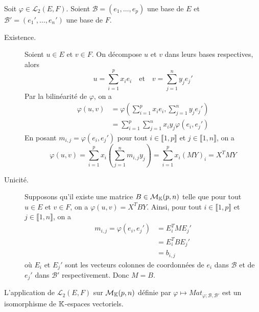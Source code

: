 \documentclass[a4paper, 12pt]{article}
\begin{document}
\begin{demonstration}
    Soit $\varphi \in \mathcal{L}_2(E, F)$. Soient $\mathscr{B} = (e_1, \dots, e_p)$ une base de $E$ et $\mathscr{B'} = (e_1', \dots, e_n')$ une base de $F$.
    \begin{description}
        \item[Existence.] Soient $u \in E$ et $v \in F$. On décompose $u$ et $v$ dans leurs bases respectives, alors
        $$
        u = \sum_{i=1}^p x_i e_i \quad \text{et} \quad v = \sum_{j=1}^n y_j e_j'
        $$
        Par la bilinéarité de $\varphi$, on a
        \begin{align*}
            \varphi(u, v) &= \varphi(\sum_{i=1}^p x_i e_i, \sum_{j=1}^n y_j e_j') \\
            &= \sum_{i=1}^p \sum_{j=1}^n x_i y_j \varphi(e_i, e_j')
        \end{align*}
        En posant $m_{i, j} = \varphi(e_i, e_j')$ pour tout $i \in \llbracket 1, p \rrbracket$ et $j \in \llbracket 1, n \rrbracket$, on a
        $$
        \varphi(u, v) = \sum_{i=1}^p x_i \left( \sum_{j=1}^n m_{i, j} y_j \right) = \sum_{i=1}^p x_i (M Y)_i = X^T M Y
        $$

        \item[Unicité.] Supposons qu'il existe une matrice $B \in \mathcal{M}_{\mathbb{K}}(p, n)$ telle que pour tout $u \in E$ et $v \in F$, on a $\varphi(u, v) = X^T B Y$.
        Ainsi, pour tout $i \in \llbracket 1, p \rrbracket$ et $j \in \llbracket 1, n \rrbracket$, on a
        \begin{align*}
            m_{i, j} = \varphi(e_i, e_j') &= E_i^T M E_j' \\
            &= E_i^T B E_j' \\
            &= b_{i, j}
        \end{align*}
        où $E_i$ et $E_j'$ sont les vecteurs colonnes de coordonnées de $e_i$ dans $\mathscr{B}$ et de $e_j'$ dans $\mathscr{B'}$ respectivement. Donc $M = B$.
    \end{description}
\end{demonstration}

\begin{proposition}{}{}
    L'application de $\mathcal{L}_2(E, F)$ sur $\mathcal{M}_{\mathbb{K}}(p, n)$ définie par $\varphi \mapsto Mat_{\varphi; \mathscr{B}, \mathscr{B'}}$ est un isomorphisme de $\mathbb{K}$-espaces vectoriels.
\end{proposition}
\end{document}
